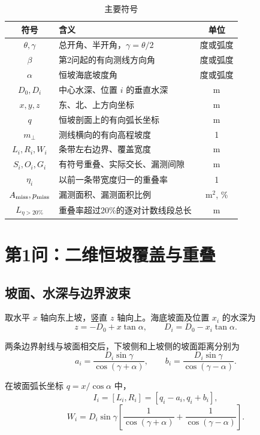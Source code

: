 \documentclass[UTF8,a4paper,12pt]{ctexart}
\begin{document}
\begin{table}[H]
\centering
\caption{主要符号}
\begin{tabular}{clc}
\toprule
符号 & 含义 & 单位\\
\midrule
$\theta,\gamma$ & 总开角、半开角，$\gamma=\theta/2$ & 度或弧度\\
$\beta$ & 第2问起的有向测线方向角 & 度或弧度\\
$\alpha$ & 恒坡海底坡度角 & 度或弧度\\
$D_0,D_i$ & 中心水深、位置 $i$ 的垂直水深 & m\\
$x,y,z$ & 东、北、上方向坐标 & m\\
$q$ & 恒坡剖面上的有向弧长坐标 & m\\
$m_\perp$ & 测线横向的有向高程坡度 & 1\\
$L_i,R_i,W_i$ & 条带左右边界、覆盖宽度 & m\\
$S_i,O_i,G_i$ & 有符号重叠、实际交长、漏测间隙 & m\\
$\eta_i$ & 以前一条带宽度归一的重叠率 & 1\\
$A_{\rm miss},p_{\rm miss}$ & 漏测面积、漏测面积比例 & $\mathrm{m}^2$, \%\\
$L_{\eta>20\%}$ & 重叠率超过20\%的逐对计数线段总长 & m\\
\bottomrule
\end{tabular}
\end{table}

\section{第1问：二维恒坡覆盖与重叠}

\subsection{坡面、水深与边界波束}

取水平 $x$ 轴向东上坡，竖直 $z$ 轴向上。海底坡面及位置 $x_i$ 的水深为
\begin{equation}
z=-D_0+x\tan\alpha,\qquad D_i=D_0-x_i\tan\alpha.
\end{equation}

两条边界射线与坡面相交后，下坡侧和上坡侧的坡面距离分别为
\begin{equation}
a_i=\frac{D_i\sin\gamma}{\cos(\gamma+\alpha)},\qquad
b_i=\frac{D_i\sin\gamma}{\cos(\gamma-\alpha)}.
\end{equation}

在坡面弧长坐标 $q=x/\cos\alpha$ 中，
\begin{equation}
I_i=[L_i,R_i]=[q_i-a_i,q_i+b_i],
\end{equation}
\begin{equation}
W_i=D_i\sin\gamma\left[
\frac{1}{\cos(\gamma+\alpha)}+
\frac{1}{\cos(\gamma-\alpha)}
\right].
\end{equation}
\end{document}
